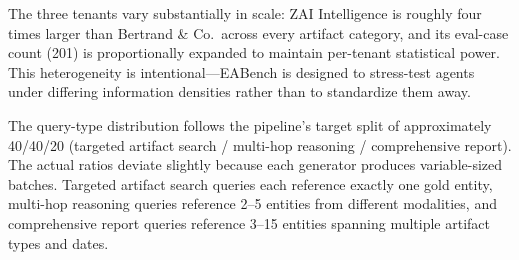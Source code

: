 \begin{table}[t]
\centering
\caption{Artifact composition and evaluation case counts for the three EABench tenants.
For chats and group chats, the count reflects distinct conversation threads rather than individual messages.
Evaluation cases span targeted artifact search, multi-hop reasoning, and comprehensive report query types (see Section~\ref{sec:eval-metrics}).}
\label{tab:dataset_summary}
\small
{}
\end{table}

\noindent The three tenants vary substantially in scale: ZAI Intelligence is roughly four times larger than Bertrand \& Co.\ across every artifact category, and its eval-case count (201) is proportionally expanded to maintain per-tenant statistical power. This heterogeneity is intentional---EABench is designed to stress-test agents under differing information densities rather than to standardize them away.

The query-type distribution follows the pipeline's target split of approximately 40/40/20 (targeted artifact search / multi-hop reasoning / comprehensive report). The actual ratios deviate slightly because each generator produces variable-sized batches. Targeted artifact search queries each reference exactly one gold entity, multi-hop reasoning queries reference 2--5 entities from different modalities, and comprehensive report queries reference 3--15 entities spanning multiple artifact types and dates.

